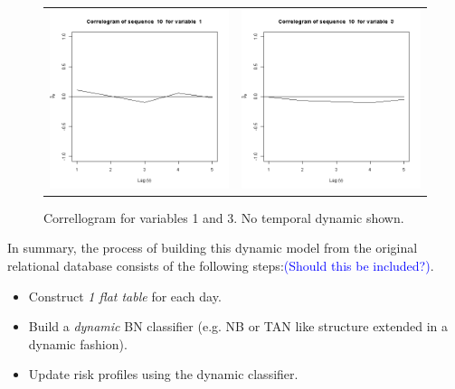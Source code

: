 \begin{figure}
  \centering
    \begin{tabular}{cc}
    \includegraphics[width=70mm]{figures/CajaMarcrl1}&
     \includegraphics[width=70mm]{figures/CajaMarcrl3}\\
  \end{tabular}
    \caption{\label{fig:cajamarCorr}Correllogram for variables 1 and 3. No temporal dynamic shown.}
\end{figure}


In summary, the process of building this dynamic model from the original relational database consists of the following steps:\textcolor{blue}{(Should this be included?)}.

\begin{itemize}
\item Construct \emph{1 flat table} for each day.
\item Build a \emph{dynamic} BN classifier (e.g. NB or TAN like structure extended in a dynamic fashion). 
\item Update risk profiles using the dynamic classifier.
\end{itemize}





